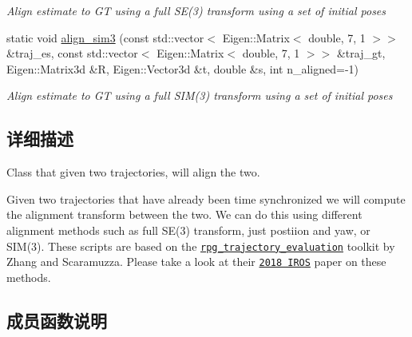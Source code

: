 \begin{DoxyCompactItemize}
\begin{DoxyCompactList}\small\item\em Align estimate to GT using a full S\+E(3) transform using a set of initial poses \end{DoxyCompactList}\item 
static void \hyperlink{classov__eval_1_1AlignTrajectory_a0413904b252f558fe47886cbbf772e63}{align\+\_\+sim3} (const std\+::vector$<$ Eigen\+::\+Matrix$<$ double, 7, 1 $>$$>$ \&traj\+\_\+es, const std\+::vector$<$ Eigen\+::\+Matrix$<$ double, 7, 1 $>$$>$ \&traj\+\_\+gt, Eigen\+::\+Matrix3d \&R, Eigen\+::\+Vector3d \&t, double \&s, int n\+\_\+aligned=-\/1)
\begin{DoxyCompactList}\small\item\em Align estimate to GT using a full S\+I\+M(3) transform using a set of initial poses \end{DoxyCompactList}\end{DoxyCompactItemize}


\subsection{详细描述}
Class that given two trajectories, will align the two. 

Given two trajectories that have already been time synchronized we will compute the alignment transform between the two. We can do this using different alignment methods such as full S\+E(3) transform, just postiion and yaw, or S\+I\+M(3). These scripts are based on the \href{https://github.com/uzh-rpg/rpg_trajectory_evaluation}{\tt rpg\+\_\+trajectory\+\_\+evaluation} toolkit by Zhang and Scaramuzza. Please take a look at their \href{http://rpg.ifi.uzh.ch/docs/IROS18_Zhang.pdf}{\tt 2018 I\+R\+OS} paper on these methods. 

\subsection{成员函数说明}
\mbox{\label{classov__eval_1_1AlignTrajectory_aea1c35dee4b15301c7248c1698ee4ffa}} 
